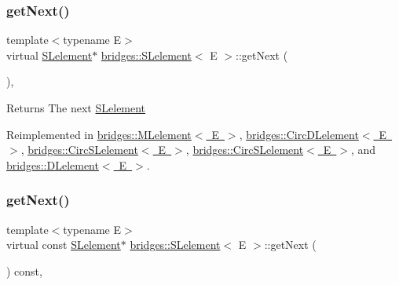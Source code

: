 \subsubsection{\texorpdfstring{get\+Next()}{getNext()}\hspace{0.1cm}{\footnotesize\ttfamily [1/2]}}
{\footnotesize\ttfamily template$<$typename E$>$ \\
virtual \mbox{\hyperlink{classbridges_1_1_s_lelement}{S\+Lelement}}$\ast$ \mbox{\hyperlink{classbridges_1_1_s_lelement}{bridges\+::\+S\+Lelement}}$<$ E $>$\+::get\+Next (\begin{DoxyParamCaption}{ }\end{DoxyParamCaption})\hspace{0.3cm}{\ttfamily [inline]}, {\ttfamily [virtual]}}

\begin{DoxyReturn}{Returns}
The next \mbox{\hyperlink{classbridges_1_1_s_lelement}{S\+Lelement}} 
\end{DoxyReturn}


Reimplemented in \mbox{\hyperlink{classbridges_1_1_m_lelement_aceebd292e7d497f44eea5c4845e7709f}{bridges\+::\+M\+Lelement$<$ E $>$}}, \mbox{\hyperlink{classbridges_1_1_circ_d_lelement_a52996d42efc5680d1f8b406143abfee5}{bridges\+::\+Circ\+D\+Lelement$<$ E $>$}}, \mbox{\hyperlink{classbridges_1_1_circ_s_lelement_aab863627c125c6f1075af7e7b7f340cf}{bridges\+::\+Circ\+S\+Lelement$<$ E $>$}}, \mbox{\hyperlink{classbridges_1_1_circ_s_lelement_aab863627c125c6f1075af7e7b7f340cf}{bridges\+::\+Circ\+S\+Lelement$<$ E $>$}}, and \mbox{\hyperlink{classbridges_1_1_d_lelement_a0c713707d8c7d0a97fe4194ed6592ede}{bridges\+::\+D\+Lelement$<$ E $>$}}.

\mbox{\label{classbridges_1_1_s_lelement_a4422b7731a84734d312b8cd8e241b1e8}} 
\subsubsection{\texorpdfstring{get\+Next()}{getNext()}\hspace{0.1cm}{\footnotesize\ttfamily [2/2]}}
{\footnotesize\ttfamily template$<$typename E$>$ \\
virtual const \mbox{\hyperlink{classbridges_1_1_s_lelement}{S\+Lelement}}$\ast$ \mbox{\hyperlink{classbridges_1_1_s_lelement}{bridges\+::\+S\+Lelement}}$<$ E $>$\+::get\+Next (\begin{DoxyParamCaption}{ }\end{DoxyParamCaption}) const\hspace{0.3cm}{\ttfamily [inline]}, {\ttfamily [virtual]}}

